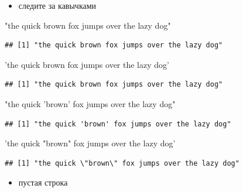 \documentclass[
]{book}
\newenvironment{Shaded}{\begin{snugshade}}{\end{snugshade}}
\newcommand{\StringTok}[1]{\textcolor[rgb]{0.31,0.60,0.02}{#1}}
\providecommand{\tightlist}{%
  \setlength{\itemsep}{0pt}\setlength{\parskip}{0pt}}
\begin{document}
\begin{itemize}
\tightlist
\item
  следите за кавычками
\end{itemize}

\begin{Shaded}
\begin{Highlighting}[]
\StringTok{"the quick brown fox jumps over the lazy dog"}
\end{Highlighting}
\end{Shaded}

\begin{verbatim}
## [1] "the quick brown fox jumps over the lazy dog"
\end{verbatim}

\begin{Shaded}
\begin{Highlighting}[]
\StringTok{'the quick brown fox jumps over the lazy dog'}
\end{Highlighting}
\end{Shaded}

\begin{verbatim}
## [1] "the quick brown fox jumps over the lazy dog"
\end{verbatim}

\begin{Shaded}
\begin{Highlighting}[]
\StringTok{"the quick 'brown' fox jumps over the lazy dog"}
\end{Highlighting}
\end{Shaded}

\begin{verbatim}
## [1] "the quick 'brown' fox jumps over the lazy dog"
\end{verbatim}

\begin{Shaded}
\begin{Highlighting}[]
\StringTok{'the quick "brown" fox jumps over the lazy dog'}
\end{Highlighting}
\end{Shaded}

\begin{verbatim}
## [1] "the quick \"brown\" fox jumps over the lazy dog"
\end{verbatim}

\begin{itemize}
\tightlist
\item
  пустая строка
\end{itemize}
\end{document}
